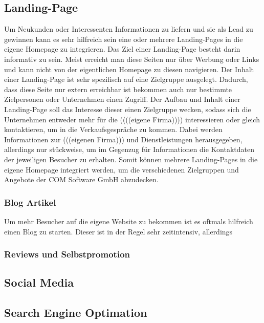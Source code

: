 \subsection{Landing-Page}
Um Neukunden oder Interessenten Informationen zu liefern und sie als Lead zu gewinnen kann es sehr hilfreich sein eine oder mehrere Landing-Pages in die eigene Homepage zu integrieren. Das Ziel einer Landing-Page besteht darin informativ zu sein. Meist erreicht man diese Seiten nur über Werbung oder Links und kann nicht von der eigentlichen Homepage zu diesen navigieren. 
\newline 
Der Inhalt einer Landing-Page ist sehr spezifisch auf eine Zielgruppe ausgelegt. Dadurch, dass diese Seite nur extern erreichbar ist bekommen auch nur bestimmte Zielpersonen oder Unternehmen einen Zugriff. Der Aufbau und Inhalt einer Landing-Page soll das Interesse dieser einen Zielgruppe wecken, sodass sich die Unternehmen entweder mehr für die ((((eigene Firma)))) interessieren oder gleich kontaktieren, um in die Verkaufsgespräche zu kommen. Dabei werden Informationen zur (((eigenen Firma))) und Dienstleistungen herausgegeben, allerdings nur stückweise, um im Gegenzug für Informationen die Kontaktdaten der jeweiligen Besucher zu erhalten.
\newline 
Somit können mehrere Landing-Pages in die eigene Homepage integriert werden, um die verschiedenen Zielgruppen und Angebote der COM Software GmbH abzudecken. 

\subsubsection{Blog Artikel}
Um mehr Besucher auf die eigene Website zu bekommen ist es oftmals hilfreich einen Blog zu starten. Dieser ist in der Regel sehr zeitintensiv, allerdings 

\subsubsection{Reviews und Selbstpromotion}

\subsection{Social Media}

\subsection{Search Engine Optimation}

